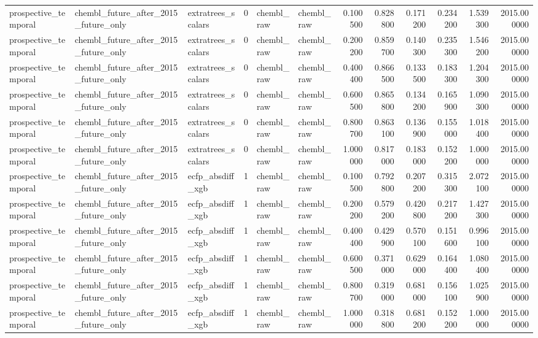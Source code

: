 \begin{longtable}{lllrllrrrrrr}
prospective\_temporal & chembl\_future\_after\_2015\_future\_only & extratrees\_scalars & 0 & chembl\_raw & chembl\_raw & 0.100500 & 0.828800 & 0.171200 & 0.234200 & 1.539300 & 2015.000000 \\
prospective\_temporal & chembl\_future\_after\_2015\_future\_only & extratrees\_scalars & 0 & chembl\_raw & chembl\_raw & 0.200200 & 0.859700 & 0.140300 & 0.235300 & 1.546200 & 2015.000000 \\
prospective\_temporal & chembl\_future\_after\_2015\_future\_only & extratrees\_scalars & 0 & chembl\_raw & chembl\_raw & 0.400400 & 0.866500 & 0.133500 & 0.183300 & 1.204300 & 2015.000000 \\
prospective\_temporal & chembl\_future\_after\_2015\_future\_only & extratrees\_scalars & 0 & chembl\_raw & chembl\_raw & 0.600500 & 0.865800 & 0.134200 & 0.165900 & 1.090300 & 2015.000000 \\
prospective\_temporal & chembl\_future\_after\_2015\_future\_only & extratrees\_scalars & 0 & chembl\_raw & chembl\_raw & 0.800700 & 0.863100 & 0.136900 & 0.155000 & 1.018400 & 2015.000000 \\
prospective\_temporal & chembl\_future\_after\_2015\_future\_only & extratrees\_scalars & 0 & chembl\_raw & chembl\_raw & 1.000000 & 0.817000 & 0.183000 & 0.152200 & 1.000000 & 2015.000000 \\
prospective\_temporal & chembl\_future\_after\_2015\_future\_only & ecfp\_absdiff\_xgb & 1 & chembl\_raw & chembl\_raw & 0.100500 & 0.792800 & 0.207200 & 0.315300 & 2.072100 & 2015.000000 \\
prospective\_temporal & chembl\_future\_after\_2015\_future\_only & ecfp\_absdiff\_xgb & 1 & chembl\_raw & chembl\_raw & 0.200200 & 0.579200 & 0.420800 & 0.217200 & 1.427300 & 2015.000000 \\
prospective\_temporal & chembl\_future\_after\_2015\_future\_only & ecfp\_absdiff\_xgb & 1 & chembl\_raw & chembl\_raw & 0.400400 & 0.429900 & 0.570100 & 0.151600 & 0.996100 & 2015.000000 \\
prospective\_temporal & chembl\_future\_after\_2015\_future\_only & ecfp\_absdiff\_xgb & 1 & chembl\_raw & chembl\_raw & 0.600500 & 0.371000 & 0.629000 & 0.164400 & 1.080400 & 2015.000000 \\
prospective\_temporal & chembl\_future\_after\_2015\_future\_only & ecfp\_absdiff\_xgb & 1 & chembl\_raw & chembl\_raw & 0.800700 & 0.319000 & 0.681000 & 0.156100 & 1.025900 & 2015.000000 \\
prospective\_temporal & chembl\_future\_after\_2015\_future\_only & ecfp\_absdiff\_xgb & 1 & chembl\_raw & chembl\_raw & 1.000000 & 0.318800 & 0.681200 & 0.152200 & 1.000000 & 2015.000000 \\

\end{longtable}
